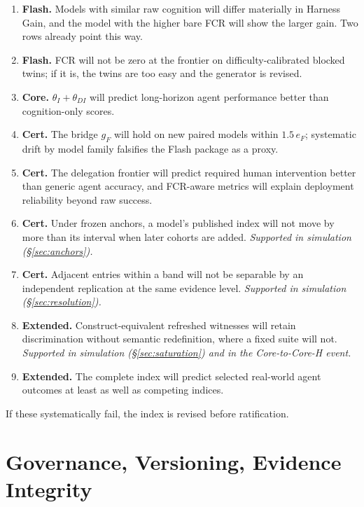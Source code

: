\begin{enumerate}[leftmargin=1.6em,itemsep=1pt]
\item \textbf{Flash.} Models with similar raw cognition will differ materially in Harness Gain, and the model with the higher bare FCR will show the larger gain. Two rows already point this way.
\item \textbf{Flash.} FCR will not be zero at the frontier on difficulty-calibrated blocked twins; if it is, the twins are too easy and the generator is revised.
\item \textbf{Core.} $\theta_I + \theta_{DI}$ will predict long-horizon agent performance better than cognition-only scores.
\item \textbf{Cert.} The bridge $g_F$ will hold on new paired models within $1.5\,e_F$; systematic drift by model family falsifies the Flash package as a proxy.
\item \textbf{Cert.} The delegation frontier will predict required human intervention better than generic agent accuracy, and FCR-aware metrics will explain deployment reliability beyond raw success.
\item \textbf{Cert.} Under frozen anchors, a model's published index will not move by more than its interval when later cohorts are added. \emph{Supported in simulation (\S\ref{sec:anchors}).}
\item \textbf{Cert.} Adjacent entries within a band will not be separable by an independent replication at the same evidence level. \emph{Supported in simulation (\S\ref{sec:resolution}).}
\item \textbf{Extended.} Construct-equivalent refreshed witnesses will retain discrimination without semantic redefinition, where a fixed suite will not. \emph{Supported in simulation (\S\ref{sec:saturation}) and in the Core-to-Core-H event.}
\item \textbf{Extended.} The complete index will predict selected real-world agent outcomes at least as well as competing indices.
\end{enumerate}
If these systematically fail, the index is revised before ratification.

\section{Governance, Versioning, Evidence Integrity}\label{sec:governance}

